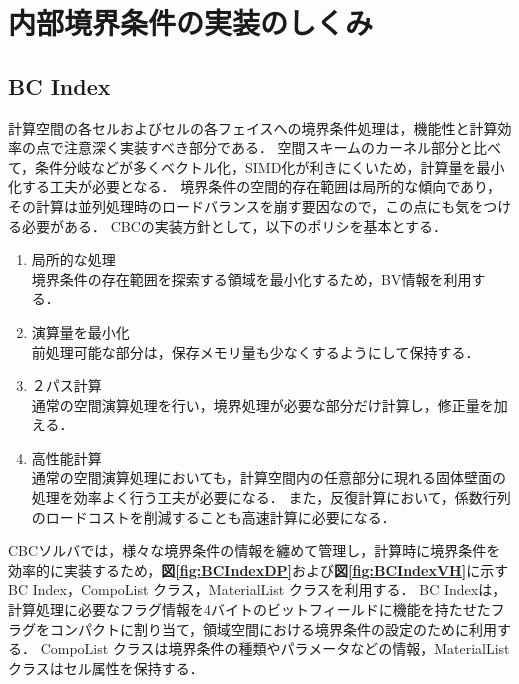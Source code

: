 \graphicspath{{./fig_Implement/}}



\section{内部境界条件の実装のしくみ}

%
\subsection{BC Index}
計算空間の各セルおよびセルの各フェイスへの境界条件処理は，機能性と計算効率の点で注意深く実装すべき部分である．
空間スキームのカーネル部分と比べて，条件分岐などが多くベクトル化，SIMD化が利きにくいため，計算量を最小化する工夫が必要となる．
境界条件の空間的存在範囲は局所的な傾向であり，その計算は並列処理時のロードバランスを崩す要因なので，この点にも気をつける必要がある．
CBCの実装方針として，以下のポリシを基本とする．

\begin{enumerate}
\item 局所的な処理\\
境界条件の存在範囲を探索する領域を最小化するため，BV情報を利用する．
\item 演算量を最小化\\
前処理可能な部分は，保存メモリ量も少なくするようにして保持する．
\item ２パス計算\\
通常の空間演算処理を行い，境界処理が必要な部分だけ計算し，修正量を加える．
\item 高性能計算\\
通常の空間演算処理においても，計算空間内の任意部分に現れる固体壁面の処理を効率よく行う工夫が必要になる．
また，反復計算において，係数行列のロードコストを削減することも高速計算に必要になる．
\end{enumerate}


CBCソルバでは，様々な境界条件の情報を纏めて管理し，計算時に境界条件を効率的に実装するため，\textbf{図\ref{fig:BCIndexDP}}および\textbf{図\ref{fig:BCIndexVH}}に示すBC Index，CompoList クラス，MaterialList クラスを利用する．
BC Indexは，計算処理に必要なフラグ情報を4バイトのビットフィールドに機能を持たせたフラグをコンパクトに割り当て，領域空間における境界条件の設定のために利用する．
CompoList クラスは境界条件の種類やパラメータなどの情報，MaterialList クラスはセル属性を保持する．


